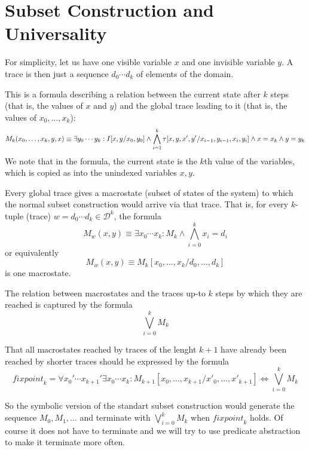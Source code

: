 \documentclass{llncs}
\begin{document}
\newcommand{\viz}{x}
\newcommand{\inviz}{y}
\newcommand{\domain}{\mathcal {D}}
\newcommand{\dvalue}{d}
\section{Subset Construction and Universality}
For simplicity, let us have one visible variable $x$ and one invisible variable $y$.
A trace is then just a sequence $d_0\cdots d_k$ of elements of the domain.

This is a formula describing a relation between the current state after $k$ steps (that is, the values of $\viz$ and $\inviz$) and the global trace leading to it (that is, the values of $\viz_0,\ldots,\viz_k$):
$$
M_k(\viz_0,\ldots,\viz_k,\inviz,\viz) \equiv \exists \inviz_0\cdots \inviz_{k}:  I[x,y/x_0,y_0] \land \bigwedge_{i=1}^k \transition[\viz,\inviz,\viz',\inviz'/\viz_{i-1},\inviz_{i-1},\viz_i,\inviz_i] \land \viz = \viz_k \land \inviz = \inviz_k 
$$
We note that in the formula, the current state is the $k$th value of the variables, which is copied as into the unindexed variables $x,y$.  

Every global trace gives a macrostate (subset of states of the system) to which the normal subset construction would arrive via that trace.
That is, for every $k$-tuple (trace) $w = \dvalue_0\cdots\dvalue_k \in \domain^k$, the formula 
$$M_{w}(\viz,\inviz) \equiv \exists \viz_0\cdots \viz_{k}: M_k \land \bigwedge_{i=0}^k{\viz_i = \dvalue_i}$$ 
or equivalently
$$M_{w}(\viz,\inviz) \equiv M_k [\viz_0,\ldots,\viz_k/\dvalue_0,\ldots,\dvalue_k] $$ 
is one macrostate. 

The relation between macrostates and the traces up-to $k$ steps by which they are reached is captured by the formula  
$$\bigvee_{i=0}^k M_k$$

That all macrostates reached by traces of the lenght $k+1$ have already been reached by shorter traces should be expressed by the formula
$$
\mathit{fixpoint}_k = \forall \viz_0'\cdots\viz_{k+1}'\exists \viz_0\cdots\viz_{k} :
M_{k+1}[\viz_0,\ldots,\viz_{k+1}/\viz'_0,\ldots,\viz'_{k+1}]
\iff 
 \bigvee_{i=0}^k M_k 
$$

So the symbolic version of the standart subset construction would generate the sequence $M_0,M_1,\ldots$ and terminate with $\bigvee_{i=0}^k M_k$ when $\mathit{fixpoint}_k$ holds.    
Of course it does not have to terminate and we will try to use predicate abstraction to make it terminate more often.
\end{document}
